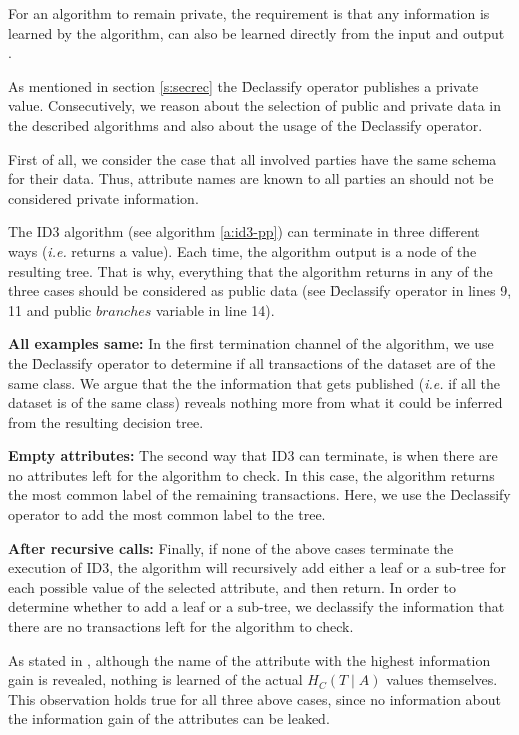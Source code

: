 For an algorithm to remain private, the requirement is that any information is learned by the algorithm, can also be learned directly from the input and output \cite{lindell2000privacy}.

As mentioned in section \ref{s:secrec} the \f{Declassify} operator publishes a private value.
Consecutively, we reason about the selection of public and private data in the described algorithms and also about the usage of the \f{Declassify} operator.

First of all, we consider the case that all involved parties have the same schema for their data.
Thus, attribute names are known to all parties an should not be considered private information.

The ID3 algorithm (see algorithm \ref{a:id3-pp}) can terminate in three different ways (\textit{i.e.} returns a value).
Each time, the algorithm output is a node of the resulting tree.
That is why, everything that the algorithm returns in any of the three cases should be considered as public data (see \f{Declassify} operator in lines 9, 11 and public $branches$ variable in line 14).

\textbf{All examples same:}
In the first termination channel of the algorithm, we use the \f{Declassify} operator to determine if all transactions of the dataset are of the same class.
We argue that the the information that gets published (\textit{i.e.} if all the dataset is of the same class) reveals nothing more from what it could be inferred from the resulting decision tree.


\textbf{Empty attributes:}
The second way that ID3 can terminate, is when there are no attributes left for the algorithm to check.
In this case, the algorithm returns the most common label of the remaining transactions.
Here, we use the \f{Declassify} operator to add the most common label to the tree.


\textbf{After recursive calls:}
Finally, if none of the above cases terminate the execution of ID3, the algorithm will recursively add either a leaf or a sub\hyp tree for each possible value of the selected attribute, and then return.
In order to determine whether to add a leaf or a sub\hyp tree, we declassify the information that there are no transactions left for the algorithm to check.


As stated in \cite{lindell2000privacy}, although the name of the attribute with the highest information gain is revealed, nothing is learned of the actual $H_C(T \mid A)$ values themselves.
This observation holds true for all three above cases, since no information about the information gain of the attributes can be leaked.

